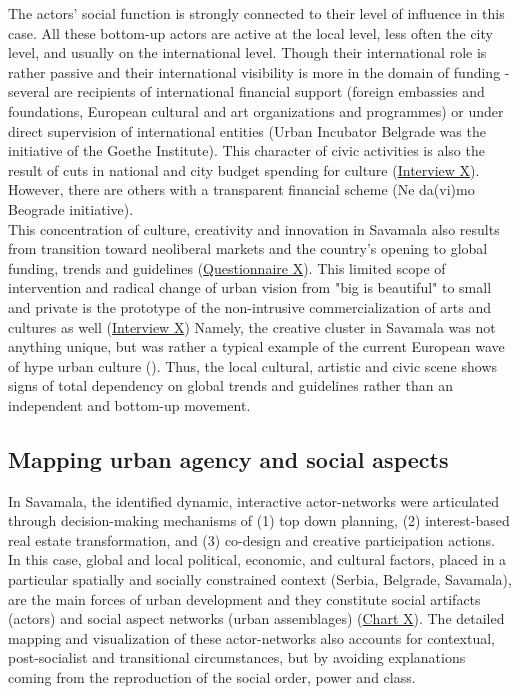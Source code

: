 \documentclass[11pt]{report}
\begin{document}
The actors’ social function is strongly connected to their level of influence in this case. All these bottom-up actors are active at the local level, less often the city level, and usually on the international level. Though their international role is rather passive and their international visibility is more in the domain of funding - several are recipients of international financial support (foreign embassies and foundations, European cultural and art organizations and programmes) or under direct supervision of international entities (Urban Incubator Belgrade was the initiative of the Goethe Institute). This character of civic activities is also the result of cuts in national and city budget spending for culture (\href{InterviewX}{Interview X}).
However, there are others with a transparent financial scheme (Ne da(vi)mo Beograde initiative). 
\\

This concentration of culture, creativity and innovation in Savamala also results from transition toward neoliberal markets and the country's opening to global funding, trends and guidelines (\href{Questionnaire Experts Savamala}{Questionnaire X}).
This limited scope of intervention and radical change of urban vision from "big is beautiful" to small and private is the prototype of the non-intrusive commercialization of arts and cultures as well (\href{InterviewX}{Interview X})
Namely, the creative cluster in Savamala was not anything unique, but was rather a typical example of the current European wave of hype urban culture (\href{B92}{\citealt{b92_savamala_2015}}).
Thus, the local cultural, artistic and civic scene shows signs of total dependency on global trends and guidelines rather than an independent and bottom-up movement. 

\subsection{Mapping urban agency and social aspects}

In Savamala, the identified dynamic, interactive actor-networks were articulated through decision-making mechanisms of (1) top down planning, (2) interest-based real estate transformation, and (3) co-design and creative participation actions. In this case, global and local political, economic, and cultural factors, placed in a particular spatially and socially constrained context (Serbia, Belgrade, Savamala), are the main forces of urban development and they constitute social artifacts (actors) and social aspect networks (urban assemblages) (\href{Table 3}{Chart X}).
The detailed mapping and visualization of these actor-networks also accounts for contextual, post-socialist and transitional circumstances, but by avoiding explanations coming from the reproduction of the social order, power and class.
\\
\end{document}
